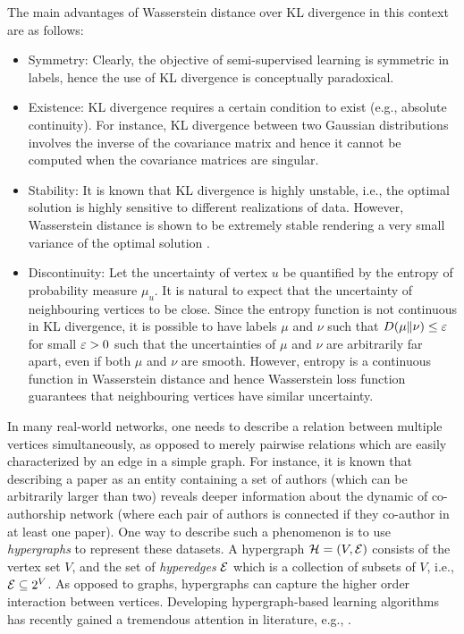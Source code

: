 \documentclass[letterpaper]{article} %
\begin{document}
The main advantages of Wasserstein distance over KL divergence in this context are as follows: 
\begin{itemize}
	\item Symmetry: Clearly, the objective of semi-supervised learning is symmetric in labels, hence the use of KL divergence is conceptually paradoxical. 
	\item Existence: KL divergence requires a certain condition to exist (e.g., absolute continuity). For instance, KL divergence  between two Gaussian distributions involves the inverse of the covariance matrix and hence it cannot be computed when the covariance matrices are singular.
	\item Stability: It is known that KL divergence is highly unstable, i.e., the optimal solution is highly sensitive to different realizations of data. However, Wasserstein distance is shown to be extremely stable rendering a very small variance of the optimal solution \cite{KLvsWass}. 
	\item Discontinuity: 	Let the uncertainty of vertex $u$ be quantified by the entropy of probability measure $\mu_u$. It is natural to expect that the uncertainty of neighbouring vertices to be close. Since the entropy function is not continuous in KL divergence, it is possible to have labels $\mu$ and $\nu$ such that $D(\mu\|\nu)\leq \varepsilon$ for small $\varepsilon>0$ such that the uncertainties of $\mu$ and $\nu$ are arbitrarily far apart, even if both $\mu$ and $\nu$ are smooth. However, entropy is a continuous function in Wasserstein distance \cite{Yury_Wasserstein} and hence Wasserstein loss function guarantees that neighbouring vertices  have similar uncertainty.
\end{itemize}

In many real-world networks, one needs to describe a relation between multiple vertices simultaneously, as opposed to merely pairwise relations which are easily characterized by an edge in a simple graph. For instance, it is known that describing a paper as an entity containing a set of authors (which can be arbitrarily larger than two) reveals deeper information about the dynamic of co-authorship network (where each pair of authors is connected if they co-author in at least one paper). One way to describe such a phenomenon is to use \emph{hypergraphs} to represent these datasets. A hypergraph ${\mathcal H}=(V, \mathcal{E})$ consists of the vertex set $V$, and the set of \textit{hyperedges} $\mathcal{E}$ which is a collection of subsets of $V$, i.e., $\mathcal{E}\subseteq 2^V$.  As opposed to graphs, hypergraphs can capture the higher order interaction between vertices. Developing hypergraph-based learning algorithms has recently gained a tremendous attention in literature, e.g., \cite{Hypergraph_Clustering,Hypergraph_Jost,Hypergraph_Game,Hypergraph_Kannan,Hypergraph_Olgica,Hypergraph_TV,HypergraphScalable}.
\end{document}

